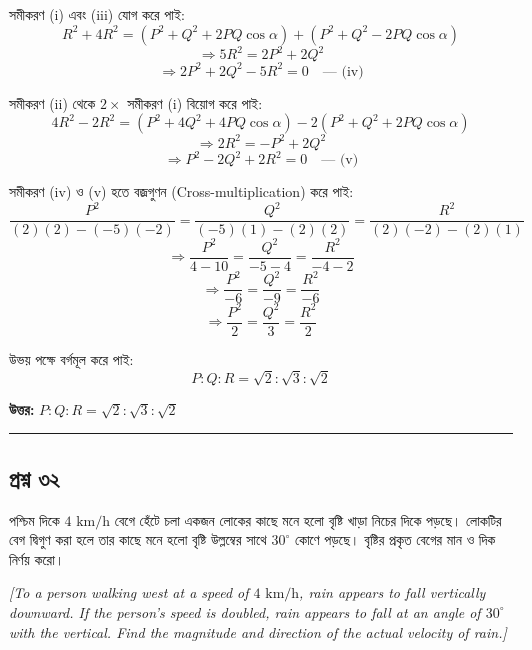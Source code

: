 \documentclass[11pt,a4paper]{article}
\begin{document}
সমীকরণ (i) এবং (iii) যোগ করে পাই:
$$R^2 + 4R^2 = (P^2 + Q^2 + 2PQ\cos\alpha) + (P^2 + Q^2 - 2PQ\cos\alpha)$$
$$\Rightarrow 5R^2 = 2P^2 + 2Q^2$$
$$\Rightarrow 2P^2 + 2Q^2 - 5R^2 = 0 \quad \text{--- (iv)}$$

সমীকরণ (ii) থেকে $2 \times$ সমীকরণ (i) বিয়োগ করে পাই:
$$4R^2 - 2R^2 = (P^2 + 4Q^2 + 4PQ\cos\alpha) - 2(P^2 + Q^2 + 2PQ\cos\alpha)$$
$$\Rightarrow 2R^2 = -P^2 + 2Q^2$$
$$\Rightarrow P^2 - 2Q^2 + 2R^2 = 0 \quad \text{--- (v)}$$

সমীকরণ (iv) ও (v) হতে বজ্রগুণন (Cross-multiplication) করে পাই:
$$\frac{P^2}{(2)(2) - (-5)(-2)} = \frac{Q^2}{(-5)(1) - (2)(2)} = \frac{R^2}{(2)(-2) - (2)(1)}$$
$$\Rightarrow \frac{P^2}{4 - 10} = \frac{Q^2}{-5 - 4} = \frac{R^2}{-4 - 2}$$
$$\Rightarrow \frac{P^2}{-6} = \frac{Q^2}{-9} = \frac{R^2}{-6}$$
$$\Rightarrow \frac{P^2}{2} = \frac{Q^2}{3} = \frac{R^2}{2}$$

উভয় পক্ষে বর্গমূল করে পাই:
$$P : Q : R = \sqrt{2} : \sqrt{3} : \sqrt{2}$$

\textbf{উত্তর:} $P : Q : R = \sqrt{2} : \sqrt{3} : \sqrt{2}$

\vspace{0.5cm}
\hrule
\vspace{0.5cm}

\subsection*{প্রশ্ন ৩২}

পশ্চিম দিকে $4\text{ km/h}$ বেগে হেঁটে চলা একজন লোকের কাছে মনে হলো বৃষ্টি খাড়া নিচের দিকে পড়ছে। লোকটির বেগ দ্বিগুণ করা হলে তার কাছে মনে হলো বৃষ্টি উল্লম্বের সাথে $30^\circ$ কোণে পড়ছে। বৃষ্টির প্রকৃত বেগের মান ও দিক নির্ণয় করো।

\smallskip
\textit{[To a person walking west at a speed of $4\text{ km/h}$, rain appears to fall vertically downward. If the person's speed is doubled, rain appears to fall at an angle of $30^\circ$ with the vertical. Find the magnitude and direction of the actual velocity of rain.]}

\vspace{0.3cm}
\begin{center}
\end{center}
\end{document}
